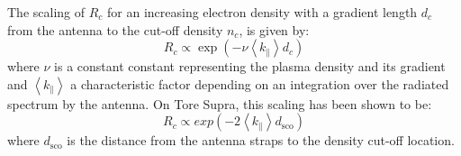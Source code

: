 The scaling of $R_c$ for an increasing electron density with a gradient length $d_c$ from the antenna to the cut-off density $n_c$,  is given by:
\begin{equation}
	R_c \propto \exp\left(- \nu \left< k_\parallel \right> d_c \right)
\end{equation}
where $\nu$ is a constant constant representing the plasma density and its gradient and $\left< k_\parallel \right>$ a characteristic factor depending on an integration over the radiated spectrum by the antenna.  On Tore Supra, this scaling has been shown to be:
\begin{equation}
R_c \propto exp\left(- 2 \left< k_\parallel \right> d_{\mathrm{sco}} \right)
\end{equation}
where $d_{\mathrm{sco}}$ is the distance from the antenna straps to the density cut-off location. 







